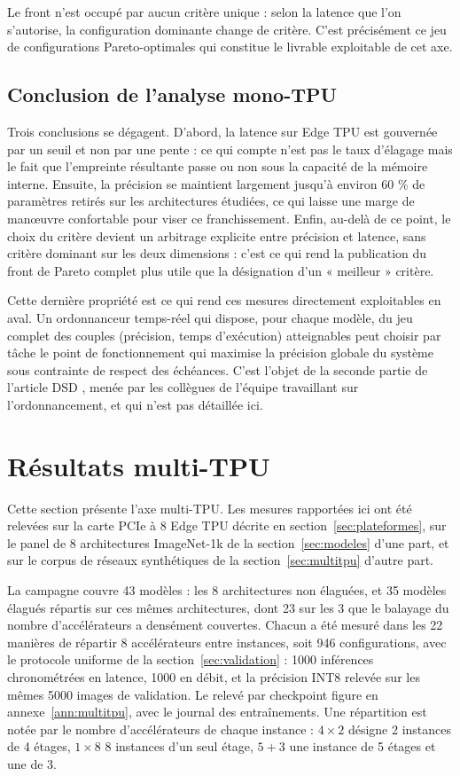\documentclass[11pt,a4paper]{report}
\begin{document}
Le front n'est occupé par aucun critère unique : selon la latence que l'on s'autorise, la configuration dominante change de critère. C'est précisément ce jeu de configurations Pareto-optimales qui constitue le livrable exploitable de cet axe.

\subsection{Conclusion de l'analyse mono-TPU}

Trois conclusions se dégagent. D'abord, la latence sur Edge TPU est gouvernée par un seuil et non par une pente : ce qui compte n'est pas le taux d'élagage mais le fait que l'empreinte résultante passe ou non sous la capacité de la mémoire interne. Ensuite, la précision se maintient largement jusqu'à environ 60 \% de paramètres retirés sur les architectures étudiées, ce qui laisse une marge de manœuvre confortable pour viser ce franchissement. Enfin, au-delà de ce point, le choix du critère devient un arbitrage explicite entre précision et latence, sans critère dominant sur les deux dimensions : c'est ce qui rend la publication du front de Pareto complet plus utile que la désignation d'un « meilleur » critère.

Cette dernière propriété est ce qui rend ces mesures directement exploitables en aval. Un ordonnanceur temps-réel qui dispose, pour chaque modèle, du jeu complet des couples (précision, temps d'exécution) atteignables peut choisir par tâche le point de fonctionnement qui maximise la précision globale du système sous contrainte de respect des échéances. C'est l'objet de la seconde partie de l'article DSD \cite{zouhdiPruningDeepNeural2026}, menée par les collègues de l'équipe travaillant sur l'ordonnancement, et qui n'est pas détaillée ici.

\section{Résultats multi-TPU}
\label{sec:res_multi}

Cette section présente l'axe multi-TPU. Les mesures rapportées ici ont été relevées sur la carte PCIe à 8 Edge TPU décrite en section~\ref{sec:plateformes}, sur le panel de 8 architectures ImageNet-1k de la section~\ref{sec:modeles} d'une part, et sur le corpus de réseaux synthétiques de la section~\ref{sec:multitpu} d'autre part.

La campagne couvre 43 modèles : les 8 architectures non élaguées, et 35 modèles élagués répartis sur ces mêmes architectures, dont 23 sur les 3 que le balayage du nombre d'accélérateurs a densément couvertes. Chacun a été mesuré dans les 22 manières de répartir 8 accélérateurs entre instances, soit 946 configurations, avec le protocole uniforme de la section~\ref{sec:validation} : 1000 inférences chronométrées en latence, 1000 en débit, et la précision INT8 relevée sur les mêmes 5000 images de validation. Le relevé par checkpoint figure en annexe~\ref{ann:multitpu}, avec le journal des entraînements. Une répartition est notée par le nombre d'accélérateurs de chaque instance : $4\times2$ désigne 2 instances de 4 étages, $1\times8$ 8 instances d'un seul étage, $5{+}3$ une instance de 5 étages et une de 3.
\end{document}

